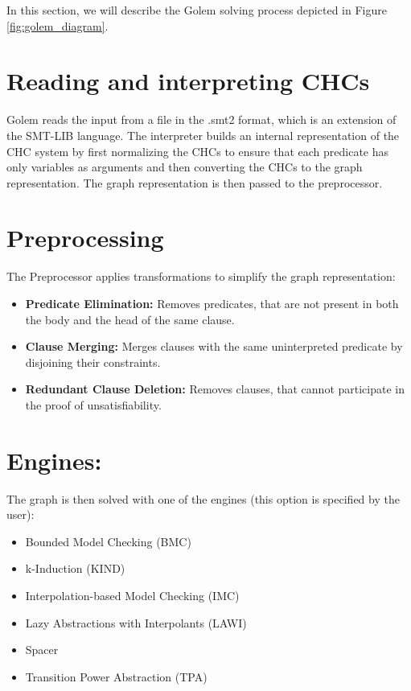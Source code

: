 \noindent In this section, we will describe the Golem solving process depicted in Figure \ref{fig:golem_diagram}.
\section*{Reading and interpreting CHCs}
\noindent Golem reads the input from a file in the .smt2 format, which is an extension of the SMT-LIB language\cite{BarFT-SMTLIB}. The interpreter builds an internal representation of the CHC system by first normalizing the CHCs to ensure that each predicate has only variables as arguments and then converting the CHCs to the graph representation. The graph representation is then passed to the preprocessor.

\section*{Preprocessing}
\noindent The Preprocessor applies transformations to simplify the graph representation:
        \begin{itemize}
            \item \textbf{Predicate Elimination:} Removes predicates, that are not present in both the body and the head of the same clause.
            \item \textbf{Clause Merging:} Merges clauses with the same uninterpreted predicate by disjoining their constraints.
            \item \textbf{Redundant Clause Deletion:} Removes clauses, that cannot participate in the proof of unsatisfiability. 
        \end{itemize}
    \section* {Engines:}
    \noindent The graph is then solved with one of the engines (this option is specified by the user):
        \begin{itemize}
            \item Bounded Model Checking (BMC) \cite{10.1007/3-540-49059-0_14}
            \item k-Induction (KIND) \cite{10.1007/3-540-40922-X_8}
            \item Interpolation-based Model Checking (IMC) \cite{10.1007/978-3-540-45069-6_1}
            \item Lazy Abstractions with Interpolants (LAWI) \cite{10.1007/11817963_14}
            \item Spacer \cite{10.1007/978-3-319-08867-9_2}
            \item Transition Power Abstraction (TPA) \cite{blicha_golem_2023}
        \end{itemize}

